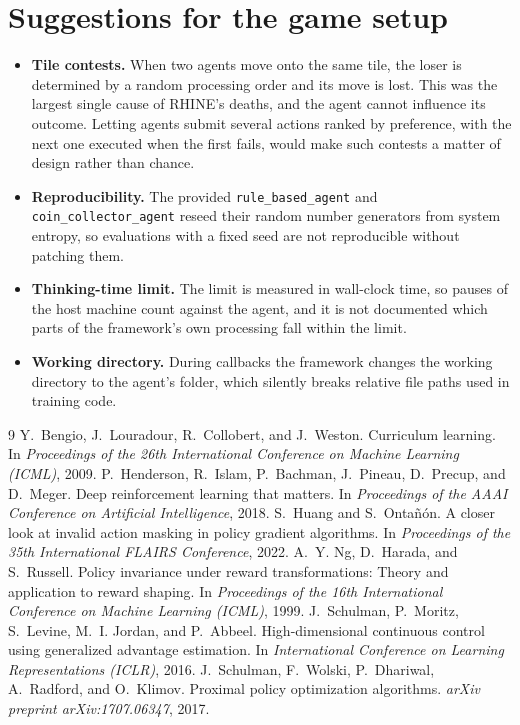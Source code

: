 \documentclass[11pt,a4paper]{report}
\begin{document}
	\section{Suggestions for the game setup}
	\begin{itemize}[noitemsep]
		\item \textbf{Tile contests.} When two agents move onto the same tile, the loser is determined by a random processing order and its move is lost. This was the largest single cause of RHINE's deaths, and the agent cannot influence its outcome. Letting agents submit several actions ranked by preference, with the next one executed when the first fails, would make such contests a matter of design rather than chance.
		\item \textbf{Reproducibility.} The provided \texttt{rule\_based\_agent} and \texttt{coin\_collector\_agent} reseed their random number generators from system entropy, so evaluations with a fixed seed are not reproducible without patching them.
		\item \textbf{Thinking-time limit.} The limit is measured in wall-clock time, so pauses of the host machine count against the agent, and it is not documented which parts of the framework's own processing fall within the limit.
		\item \textbf{Working directory.} During callbacks the framework changes the working directory to the agent's folder, which silently breaks relative file paths used in training code.
	\end{itemize}
	
	
	\begin{thebibliography}{9}
		 Y.~Bengio, J.~Louradour, R.~Collobert, and J.~Weston. Curriculum learning. In \emph{Proceedings of the 26th International Conference on Machine Learning (ICML)}, 2009.
		 P.~Henderson, R.~Islam, P.~Bachman, J.~Pineau, D.~Precup, and D.~Meger. Deep reinforcement learning that matters. In \emph{Proceedings of the AAAI Conference on Artificial Intelligence}, 2018.
		 S.~Huang and S.~Onta\~{n}\'{o}n. A closer look at invalid action masking in policy gradient algorithms. In \emph{Proceedings of the 35th International FLAIRS Conference}, 2022.
		 A.~Y. Ng, D.~Harada, and S.~Russell. Policy invariance under reward transformations: Theory and application to reward shaping. In \emph{Proceedings of the 16th International Conference on Machine Learning (ICML)}, 1999.
		 J.~Schulman, P.~Moritz, S.~Levine, M.~I. Jordan, and P.~Abbeel. High-dimensional continuous control using generalized advantage estimation. In \emph{International Conference on Learning Representations (ICLR)}, 2016.
		 J.~Schulman, F.~Wolski, P.~Dhariwal, A.~Radford, and O.~Klimov. Proximal policy optimization algorithms. \emph{arXiv preprint arXiv:1707.06347}, 2017.
	\end{thebibliography}
\end{document}
